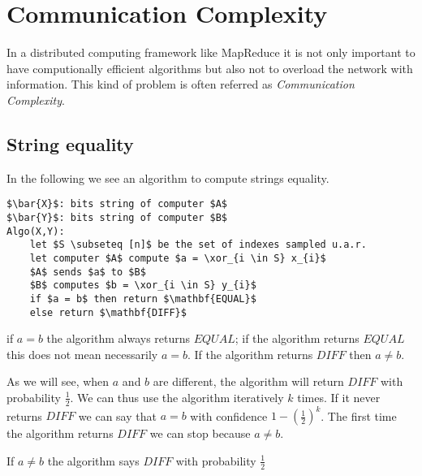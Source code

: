 \chapter{Communication Complexity}\label{ch:comm-complex}

In a distributed computing framework like MapReduce it is not only important to have computionally efficient algorithms but also not to overload the network with information. This kind of problem is often referred as \emph{Communication Complexity}.

\section{String equality}\label{sec:string-eq}
In the following we see an algorithm to compute strings equality.

\begin{lstlisting}[caption={Greedy algorithm},label={lst:fS-greedycc}]
$\bar{X}$: bits string of computer $A$
$\bar{Y}$: bits string of computer $B$
Algo(X,Y):
    let $S \subseteq [n]$ be the set of indexes sampled u.a.r.
    let computer $A$ compute $a = \xor_{i \in S} x_{i}$
    $A$ sends $a$ to $B$
    $B$ computes $b = \xor_{i \in S} y_{i}$
    if $a = b$ then return $\mathbf{EQUAL}$
    else return $\mathbf{DIFF}$
\end{lstlisting}

\begin{obs}
if $a = b$ the algorithm always returns $EQUAL$; if the algorithm returns $EQUAL$ this does not mean necessarily $a = b$. If the algorithm returns $DIFF$ then $a \neq b$.
\end{obs}

As we will see, when $a$ and $b$ are different, the algorithm will return $DIFF$ with probability $\frac{1}{2}$.
We can thus use the algorithm iteratively $k$ times. If it never returns $DIFF$ we can say that $a = b$ with confidence $1 - (\frac{1}{2})^k$. The first time the algorithm returns $DIFF$ we can stop because $a \neq b$.

\begin{thm}
    If $a \neq b$ the algorithm says $DIFF$ with probability $\frac{1}{2}$
\end{thm}

